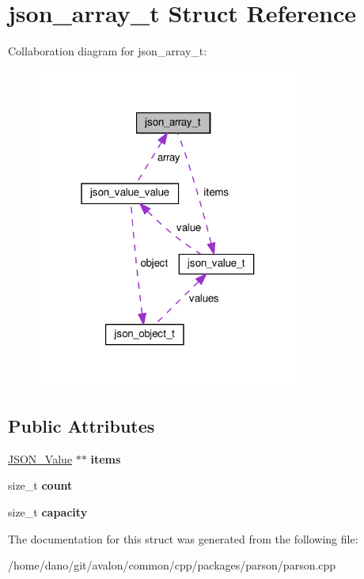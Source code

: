 \hypertarget{structjson__array__t}{}\section{json\+\_\+array\+\_\+t Struct Reference}
\label{structjson__array__t}


Collaboration diagram for json\+\_\+array\+\_\+t\+:
\nopagebreak
\begin{figure}[H]
\begin{center}
\leavevmode
\includegraphics[width=244pt]{structjson__array__t__coll__graph}
\end{center}
\end{figure}
\subsection*{Public Attributes}
\begin{DoxyCompactItemize}
\item 
\mbox{\label{structjson__array__t_abef9539699db9baeb8d1b8afd47bbc47}} 
\hyperlink{structjson__value__t}{J\+S\+O\+N\+\_\+\+Value} $\ast$$\ast$ {\bfseries items}
\item 
\mbox{\label{structjson__array__t_a6381130e904211a18c464f6890a7117a}} 
size\+\_\+t {\bfseries count}
\item 
\mbox{\label{structjson__array__t_a310f6c2b5e880ae4e29c6718a8dd072c}} 
size\+\_\+t {\bfseries capacity}
\end{DoxyCompactItemize}


The documentation for this struct was generated from the following file\+:\begin{DoxyCompactItemize}
\item 
/home/dano/git/avalon/common/cpp/packages/parson/parson.\+cpp\end{DoxyCompactItemize}
